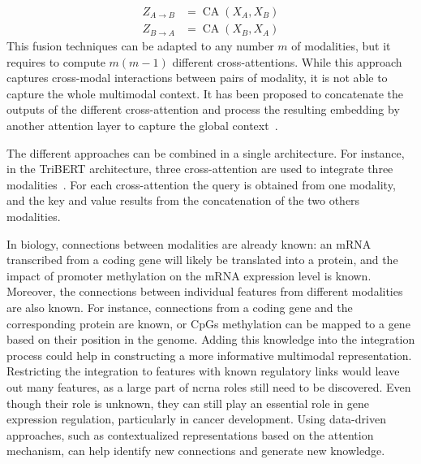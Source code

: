 \documentclass[../main.tex]{subfiles}
\begin{document}
\begin{description}[%
			style=multiline,
			leftmargin=!,
			labelwidth=3cm,
		]
			\setlength{\belowdisplayshortskip}{0pt}
			\begin{align*}
				Z_{A \rightarrow B} & = \operatorname{CA}\left(X_A, X_B \right) \\
				Z_{B \rightarrow A} & = \operatorname{CA}\left(X_B, X_A \right)
			\end{align*} %
			\endgroup
			This fusion techniques can be adapted to any number \(m\) of modalities, but it requires to compute \(m\left(m-1\right)\) different cross-attentions.
			While this approach captures cross-modal interactions between pairs of modality, it is not able to capture the whole multimodal context.
			It has been proposed to concatenate the outputs of the different cross-attention and process the resulting embedding by another attention layer to capture the global context~\cite{tsai-etal-2019-multimodal}.
	\end{description}
	The different approaches can be combined in a single architecture.
	For instance, in the TriBERT architecture, three cross-attention are used to integrate three modalities~\cite{TriBERT}.
	For each cross-attention the query is obtained from one modality, and the key and value results from the concatenation of the two others modalities.

	In biology, connections between modalities are already known: an mRNA transcribed from a coding gene will likely be translated into a protein, and the impact of promoter methylation on the mRNA expression level is known.
	Moreover, the connections between individual features from different modalities are also known.
	For instance, connections from a coding gene and the corresponding protein are known, or CpGs methylation can be mapped to a gene based on their position in the genome.
	Adding this knowledge into the integration process could help in constructing a more informative multimodal representation.
	Restricting the integration to features with known regulatory links would leave out many features, as a large part of \gls{ncrna} roles still need to be discovered.
	Even though their role is unknown, they can still play an essential role in gene expression regulation, particularly in cancer development.
	Using data-driven approaches, such as contextualized representations based on the attention mechanism, can help identify new connections and generate new knowledge.
\end{document}
